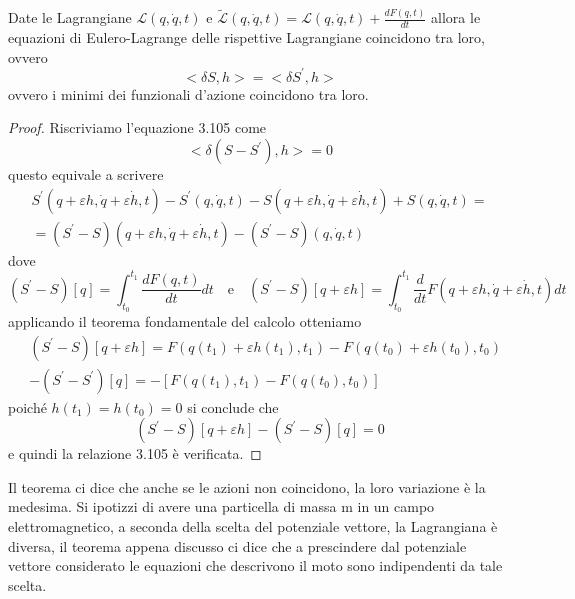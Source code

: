 \begin{theorem} Date le Lagrangiane $\mathcal{L}(q,\dot{q},t)$ e $\tilde{\mathcal{L}}(q,\dot{q},t) = \mathcal{L}(q,\dot{q},t) + \frac{d F(q,t)}{dt}$ allora le equazioni di Eulero-Lagrange delle rispettive Lagrangiane coincidono tra loro, ovvero
\begin{equation}
	<\delta S,h> = <\delta S^{\prime},h>
\end{equation}
ovvero i minimi dei funzionali d'azione coincidono tra loro.
\end{theorem}
\begin{proof}
Riscriviamo l'equazione 3.105 come
\begin{equation*}
<\delta(S-S^{\prime}),h> = 0
\end{equation*} 
questo equivale a scrivere 
\begin{equation*}
\begin{aligned}
& S^{\prime}(q+\varepsilon h, \dot{q}+\varepsilon \dot{h}, t)-S^{\prime}(q, \dot{q}, t)-S(q+\varepsilon h, \dot{q}+\varepsilon \dot{h}, t)+S(q, \dot{q}, t) =& \\ 
&=(S^{\prime}-S)(q+\varepsilon h, \dot{q}+\varepsilon \dot{h}, t) - (S^{\prime}-S)(q,\dot{q},t)&
\end{aligned}
\end{equation*}
dove 
\begin{equation*}
	(S^{\prime}-S)[q] = \int_{t_0}^{t_1} \frac{dF(q,t)}{dt}dt \quad \text{e} \quad \left(S^{\prime}-S\right)[q+\varepsilon h]=\int_{t_0}^{t_1} \frac{d}{d t} F(q+\varepsilon h, \dot{q}+\varepsilon \dot{h}, t) d t
\end{equation*}
applicando il teorema fondamentale del calcolo otteniamo 
\begin{equation*}
\begin{aligned}
& \left(S^{\prime}-S\right)[q+\varepsilon h]=F\left(q\left(t_1\right)+\varepsilon h\left(t_1\right), t_1\right)-F\left(q\left(t_0\right)+\varepsilon h\left(t_0\right), t_0\right) \\
& -\left(S^{\prime}-S^{\prime}\right)[q]=-\left[F\left(q\left(t_1\right), t_1\right)-F\left(q\left(t_0\right), t_0\right)\right]
\end{aligned}
\end{equation*}
poich\'{e} $h(t_1) = h(t_0) = 0$ si conclude che 
\begin{equation*}
\left(S^{\prime}-S\right)[q+\varepsilon h]-\left(S^{\prime}-S\right) \left[ q \right]=0
\end{equation*}
e quindi la relazione 3.105 \`{e} verificata.
\end{proof}
\noindent Il teorema ci dice che anche se le azioni non coincidono, la loro variazione \`{e} la medesima. Si ipotizzi di avere una particella di massa m in un campo elettromagnetico, a seconda della scelta del potenziale vettore, la Lagrangiana \`{e} diversa, il teorema appena discusso ci dice che a prescindere dal potenziale vettore considerato le equazioni che descrivono il moto sono indipendenti da tale scelta.

